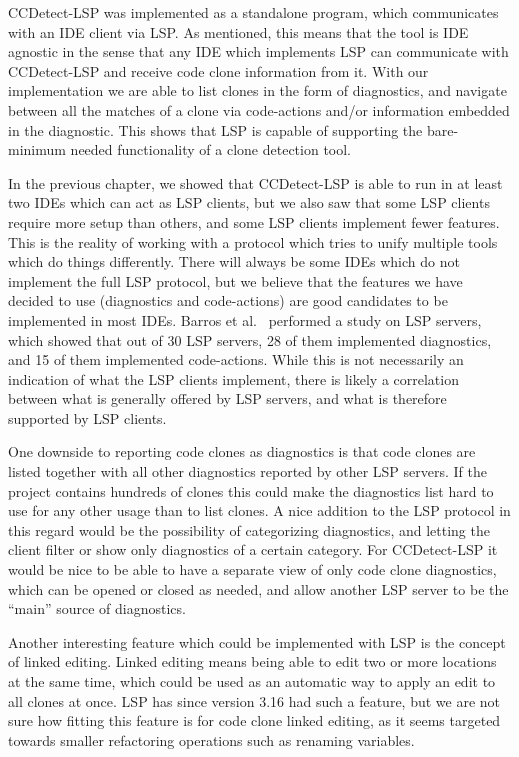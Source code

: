 CCDetect-LSP was implemented as a standalone program, which communicates with an IDE
client via LSP. As mentioned, this means that the tool is IDE agnostic in the sense that
any IDE which implements LSP can communicate with CCDetect-LSP and receive code clone
information from it. With our implementation we are able to list clones in the form of
diagnostics, and navigate between all the matches of a clone via code-actions and/or
information embedded in the diagnostic. This shows that LSP is capable of supporting the
bare-minimum needed functionality of a clone detection tool. 

In the previous chapter, we showed that CCDetect-LSP is able to run in at least two IDEs
which can act as LSP clients, but we also saw that some LSP clients require more setup
than others, and some LSP clients implement fewer features. This is the reality of working
with a protocol which tries to unify multiple tools which do things differently. There
will always be some IDEs which do not implement the full LSP protocol, but we believe that
the features we have decided to use (diagnostics and code-actions) are good candidates to
be implemented in most IDEs. Barros et al.~\cite{LSPPractices} performed a study on LSP
servers, which showed that out of 30 LSP servers, 28 of them implemented diagnostics, and
15 of them implemented code-actions. While this is not necessarily an indication of what
the LSP clients implement, there is likely a correlation between what is generally offered
by LSP servers, and what is therefore supported by LSP clients.

One downside to reporting code clones as diagnostics is that code clones are listed
together with all other diagnostics reported by other LSP servers. If the project contains
hundreds of clones this could make the diagnostics list hard to use for any other usage
than to list clones. A nice addition to the LSP protocol in this regard would be the
possibility of categorizing diagnostics, and letting the client filter or show only
diagnostics of a certain category. For CCDetect-LSP it would be nice to be able to have a
separate view of only code clone diagnostics, which can be opened or closed as needed, and
allow another LSP server to be the ``main'' source of diagnostics.

Another interesting feature which could be implemented with LSP is the concept of linked
editing. Linked editing means being able to edit two or more locations at the same time,
which could be used as an automatic way to apply an edit to all clones at once. LSP has
since version 3.16 had such a feature, but we are not sure how fitting this feature is for
code clone linked editing, as it seems targeted towards smaller refactoring operations
such as renaming variables.

